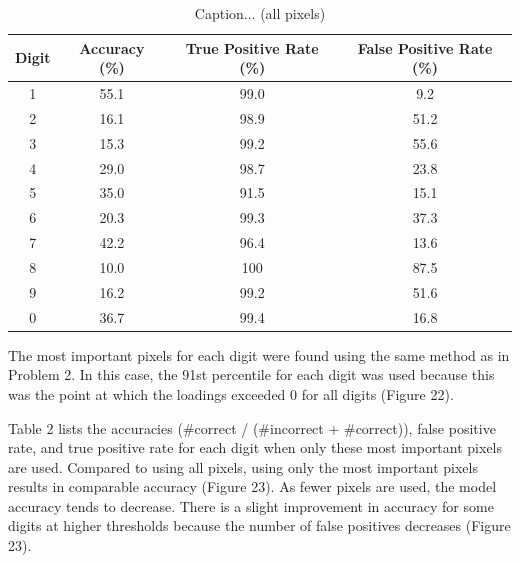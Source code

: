 \documentclass[10pt]{article}
\begin{document}
\begin{table}[ht]
\caption{Caption... (all pixels)}
\label{table1}
\begin{tabular}{|c|c|c|c|}
\hline
Digit & Accuracy (\%) & True Positive Rate (\%) & False Positive Rate (\%) \\ \hline
1     & 55.1          & 99.0                    & 9.2                      \\ \hline
2     & 16.1          & 98.9                    & 51.2                     \\ \hline
3     & 15.3          & 99.2                    & 55.6                     \\ \hline
4     & 29.0          & 98.7                    & 23.8                     \\ \hline
5     & 35.0          & 91.5                    & 15.1                     \\ \hline
6     & 20.3          & 99.3                    & 37.3                     \\ \hline
7     & 42.2          & 96.4                    & 13.6                     \\ \hline
8     & 10.0          & 100                     & 87.5                     \\ \hline
9     & 16.2          & 99.2                    & 51.6                     \\ \hline
0     & 36.7          & 99.4                    & 16.8                     \\ \hline
\end{tabular}
\end{table}

The most important pixels for each digit were found using the same method as in Problem 2. In this case, the 91st percentile for each digit was used because this was the point at which the loadings exceeded 0 for all digits (Figure 22). %

Table 2 lists the accuracies (\#correct / (\#incorrect + \#correct)), false positive rate, and true positive rate for each digit when only these most important pixels are used. Compared to using all pixels, using only the most important pixels results in comparable accuracy (Figure 23). As fewer pixels are used, the model accuracy tends to decrease. There is a slight improvement in accuracy for some digits at higher thresholds because the number of false positives decreases (Figure 23). %
\end{document}
